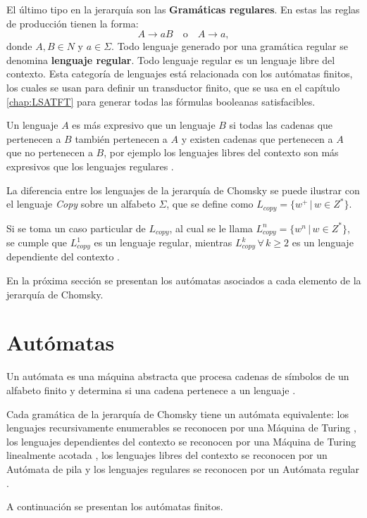 El último tipo en la jerarquía son las \textbf{Gramáticas regulares}. En estas las reglas de producción tienen la forma:
\[
  A \to aB \quad \text{o} \quad A \to a,
\]
donde \(A, B \in N\) y \(a \in \Sigma\).
Todo lenguaje generado por una gramática regular se denomina \textbf{lenguaje regular}.
Todo lenguaje regular es un lenguaje libre del contexto. Esta categoría de lenguajes está relacionada con los autómatas
finitos, los cuales se usan para definir un transductor finito, que se usa en el capítulo \ref{chap:LSATFT} para 
generar todas las fórmulas booleanas satisfacibles.

Un lenguaje $A$ es más expresivo que un lenguaje $B$ si todas las cadenas que pertenecen a $B$ también pertenecen a $A$ y existen cadenas 
que pertenecen a $A$ que no pertenecen a $B$, por ejemplo los lenguajes libres del contexto son más expresivos que los lenguajes regulares \cite{authomataTheory}. 

La diferencia entre los lenguajes de la jerarquía de Chomsky se puede ilustrar con el lenguaje \textit{Copy} sobre un alfabeto $\Sigma$, que se define como 
$L_{copy}=\{w^+\,|\,w\in Z^*\}$. 

Si se toma un caso particular de $L_{copy}$, al cual se le llama $L_{copy}^n=\{w^n\,|\,w\in Z^*\}$, se cumple que 
$L_{copy}^1$ es un lenguaje regular, mientras $L_{copy}^k\,\forall\,k\geq 2$ es un lenguaje dependiente del contexto \cite{authomataTheory}. 

En la próxima sección se presentan los autómatas asociados a cada elemento de la jerarquía de Chomsky. 

\section{Autómatas}

Un autómata es una máquina abstracta que procesa cadenas de símbolos de un alfabeto finito y determina si una 
cadena pertenece a un lenguaje \cite{authomataTheory}.

Cada gramática de la jerarquía de Chomsky tiene un autómata equivalente: los lenguajes recursivamente enumerables se reconocen por una Máquina de Turing \cite{authomataTheory}, los lenguajes dependientes del contexto se reconocen por una Máquina de Turing linealmente acotada \cite{authomataTheory}, los lenguajes libres del contexto se reconocen por un Autómata de pila \cite{authomataTheory} y los lenguajes regulares se reconocen por un Autómata regular \cite{authomataTheory}.

A continuación se presentan los autómatas finitos.

